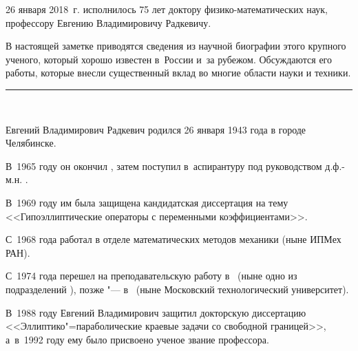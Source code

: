 \footnotesize



\smallskip





26 января 2018~г. исполнилось 75 лет доктору физико-математических наук, профессору Евгению Владимировичу Радкевичу.



В настоящей  заметке приводятся сведения из научной биографии этого крупного ученого, который хорошо известен в~России и~за рубежом. Обсуждаются его работы, которые внесли существенный вклад во многие области науки и техники.






\renewcommand{\JournalDataOnline}{\displaydate{radkeviche}}



\smallskip



\par\noindent

\theonlinerudate \par\noindent

\rule{68mm}{.7pt}\\



\normalsize



Евгений Владимирович Радкевич родился 26 января 1943 года в городе Челябинске. 

В~1965 году он окончил , затем поступил в~аспирантуру под руководством д.ф.-м.н. . 

В~1969 году им была защищена кандидатская диссертация на тему <<Гипоэллиптические операторы с переменными коэффициентами>>. 

С~1968 года работал в отделе математических методов механики  (ныне ИПМех РАН). 

С~1974 года перешел на преподавательскую работу в~ (ныне одно из подразделений ), позже "--- в~ (ныне Московский технологический университет). 

В~1988 году Евгений Владимирович защитил докторскую диссертацию <<Эллиптико"=параболические краевые задачи со свободной границей>>, а~в~1992 году ему было присвоено ученое звание профессора. 

